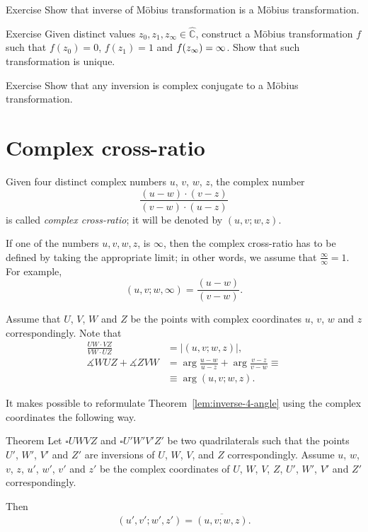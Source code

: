 \begin{thm}{Exercise}\label{ex:inverse-Mob}
Show that inverse of M\"obius transformation is a M\"obius transformation.
\end{thm}


\begin{thm}{Exercise}\label{ex:3-point-Mob}
Given distinct values $z_0,z_1,z_\infty\in \hat{\mathbb{C}}$,
construct a M\"obius transformation $f$ such that $f(z_0)=0$, $f(z_1)=1$ and $f(z_\infty)\z=\infty$.
Show that such transformation is unique.
\end{thm}

\begin{thm}{Exercise}\label{ex:invesion-Mob}
Show that any inversion is complex conjugate to a M\"obius transformation.  
\end{thm}



\section*{Complex cross-ratio}

Given four distinct complex numbers $u$, $v$, $w$, $z$,
the complex number
$$
\frac{(u-w)\cdot(v-z)}{(v-w)\cdot(u-z)}$$
is called \emph{complex cross-ratio}; 
it will be denoted by $(u,v;w,z)$.

If one of the numbers $u, v, w, z$, is $\infty$, 
then the complex cross-ratio has to be defined by taking the appropriate limit; in other words, we assume that $\frac\infty\infty=1$.
For example,
$$(u, v; w, \infty)=\frac{(u-w)}{(v-w)}.$$

Assume that $U$, $V$, $W$ and  $Z$ be the points with complex coordinates  
$u$, $v$, $w$ and $z$ correspondingly.
Note that 
\begin{align*}
\frac{UW\cdot VZ}{VW\cdot UZ}&=|(u,v;w,z)|,
\\
\measuredangle WUZ +\measuredangle ZVW&=\arg\frac{u-w}{u-z}+\arg\frac{v-z}{v-w}\equiv 
\\
&\equiv \arg(u,v;w,z).
\end{align*}

It makes possible to reformulate Theorem~\ref{lem:inverse-4-angle} using the complex coordinates
the following way.

\begin{thm}{Theorem}\label{lem:inverse-4-angle-C}
Let $\square UWVZ$ and $\square U'W'V'Z'$  be two quadrilaterals 
such that the points $U'$, $W'$, $V'$ and $Z'$ are inversions of $U$, $W$, $V$, and $Z$ correspondingly.
Assume $u$, $w$, $v$, $z$, $u'$, $w'$, $v'$ and $z'$ be the complex coordinates of $U$, $W$, $V$, $Z$, $U'$, $W'$, $V'$ and $Z'$ correspondingly.

Then 
$$(u',v';w',z')=\overline{(u,v;w,z)}.$$

\end{thm}

